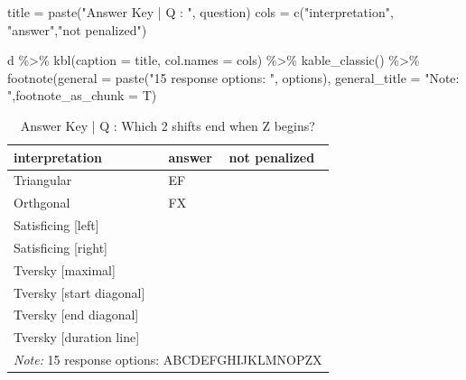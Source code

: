 \documentclass[
  letterpaper,
  DIV=11,
  numbers=noendperiod]{scrreprt}
\newenvironment{Shaded}{\begin{snugshade}}{\end{snugshade}}
\newcommand{\AttributeTok}[1]{\textcolor[rgb]{0.40,0.45,0.13}{#1}}
\newcommand{\FunctionTok}[1]{\textcolor[rgb]{0.28,0.35,0.67}{#1}}
\newcommand{\NormalTok}[1]{\textcolor[rgb]{0.00,0.23,0.31}{#1}}
\newcommand{\OtherTok}[1]{\textcolor[rgb]{0.00,0.23,0.31}{#1}}
\newcommand{\SpecialCharTok}[1]{\textcolor[rgb]{0.37,0.37,0.37}{#1}}
\newcommand{\StringTok}[1]{\textcolor[rgb]{0.13,0.47,0.30}{#1}}
\begin{document}
\begin{Shaded}
\begin{Highlighting}[]
\NormalTok{title }\OtherTok{=} \FunctionTok{paste}\NormalTok{(}\StringTok{"Answer Key | Q : "}\NormalTok{, question)}
\NormalTok{cols }\OtherTok{=} \FunctionTok{c}\NormalTok{(}\StringTok{"interpretation"}\NormalTok{, }\StringTok{"answer"}\NormalTok{,}\StringTok{"not penalized"}\NormalTok{)}

\NormalTok{d }\SpecialCharTok{\%\textgreater{}\%} \FunctionTok{kbl}\NormalTok{(}\AttributeTok{caption =}\NormalTok{ title, }\AttributeTok{col.names =}\NormalTok{ cols) }\SpecialCharTok{\%\textgreater{}\%} \FunctionTok{kable\_classic}\NormalTok{() }\SpecialCharTok{\%\textgreater{}\%}
  \FunctionTok{footnote}\NormalTok{(}\AttributeTok{general =} \FunctionTok{paste}\NormalTok{(}\StringTok{"15 response options: "}\NormalTok{, options), }\AttributeTok{general\_title =} \StringTok{"Note: "}\NormalTok{,}\AttributeTok{footnote\_as\_chunk =}\NormalTok{ T)}
\end{Highlighting}
\end{Shaded}

\begin{table}

\caption{Answer Key | Q :  Which 2 shifts end when Z begins?}
\centering
\begin{tabular}[t]{l|l|l}
\hline
interpretation & answer & not penalized\\
\hline
Triangular & EF & \\
\hline
Orthgonal & FX & \\
\hline
Satisficing [left] &  & \\
\hline
Satisficing [right] &  & \\
\hline
Tversky [maximal] &  & \\
\hline
Tversky [start diagonal] &  & \\
\hline
Tversky [end diagonal] &  & \\
\hline
Tversky [duration line] &  & \\
\hline
\multicolumn{3}{l}{\rule{0pt}{1em}\textit{Note: } 15 response options:  ABCDEFGHIJKLMNOPZX}\\
\end{tabular}
\end{table}
\end{document}
